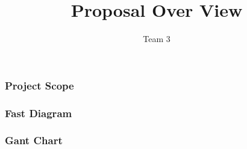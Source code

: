 \documentclass[12pt]{beamer}
\author{Team 3}
\title{Proposal Over View}
\institute{Michigan State University}
\begin{document}
	\maketitle
	
	\begin{frame}
		\frametitle{Project Scope}
	\end{frame}
	
	\begin{frame}
		\frametitle{Fast Diagram}
		
	\end{frame}
	
	\begin{frame}
		\frametitle{Gant Chart}
		\scalebox{.75}{}
	\end{frame}
\end{document}
